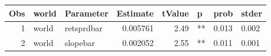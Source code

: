 

\begin{longtable}{|r|l|l|r|r|l|l|l|}\hline
   Obs &    world &    Parameter &    Estimate &    tValue &    p &    prob &    stder\\\hline
\endhead
   1 &    world &    retsprdbar &    0.005761 &    2.49 &    ** &    0.013 &    0.002\\\hline
   2 &    world &    slopebar &    0.002052 &    2.55 &    ** &    0.011 &    0.001\\\hline
\end{longtable}

